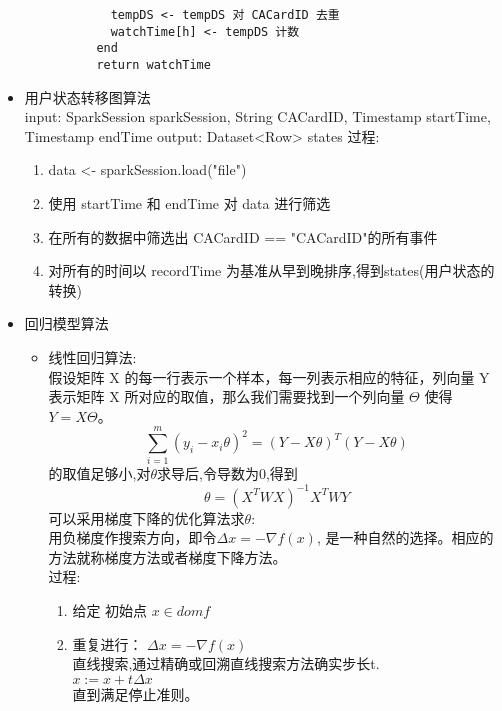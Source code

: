 \documentclass{hitreport}
\begin{document}
\begin{itemize}
\begin{lstlisting}
            tempDS <- tempDS 对 CACardID 去重
            watchTime[h] <- tempDS 计数
          end
          return watchTime
        \end{lstlisting}
  \item 用户状态转移图算法\\
        input: SparkSession sparkSession, String CACardID, Timestamp startTime, Timestamp endTime
        output: Dataset<Row> states
        过程:
        \begin{enumerate}
          \item data <- sparkSession.load("file")
          \item 使用 startTime 和 endTime 对 data 进行筛选
          \item 在所有的数据中筛选出 CACardID == "CACardID"的所有事件
          \item 对所有的时间以 recordTime 为基准从早到晚排序,得到states(用户状态的转换)
        \end{enumerate}
  \item 回归模型算法\\
        \begin{itemize}
          \item 线性回归算法:\\
                假设矩阵 X 的每一行表示一个样本，每一列表示相应的特征，列向量 Y 表示矩阵 X 所对应的取值，那么我们需要找到一个列向量 $\Theta$ 使得 $Y=X\Theta$。
                $$\sum_{i=1}^{m}(y_i-x_i\theta)^2 = (Y-X\theta)^T(Y-X\theta)$$
                的取值足够小,对$\theta$求导后,令导数为0,得到$$\theta = (X^TWX)^{-1}X^TWY$$
                可以采用梯度下降的优化算法求$\theta$:\\
                用负梯度作搜索方向，即令$\Delta x=−\nabla f(x)$, 是一种自然的选择。相应的方法就称梯度方法或者梯度下降方法。\\
                过程:\\
                \begin{enumerate}
                  \item 给定 初始点 $x \in domf$
                  \item 重复进行：
                        $\Delta x=−\nabla f(x)$\\
                        直线搜索,通过精确或回溯直线搜索方法确实步长t.\\
                        $x:=x+t\Delta x$\\
                        直到满足停止准则。\\
                \end{enumerate}

\end{itemize}
\end{itemize}
\end{document}
